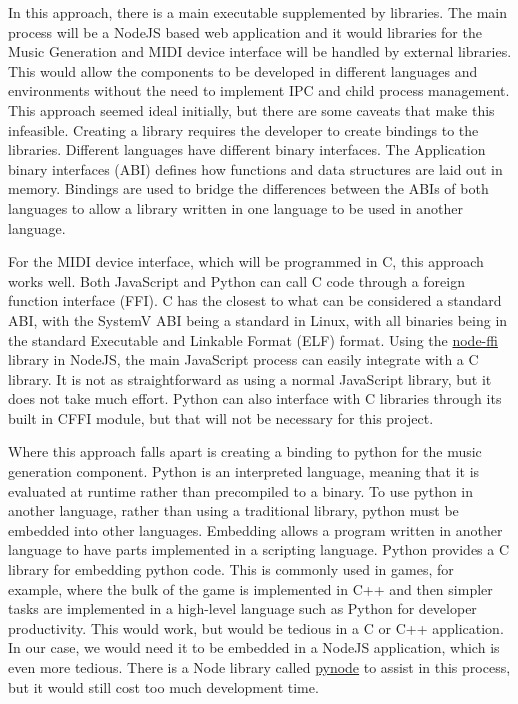 In this approach, there is a main executable supplemented by libraries. The main process
will be a NodeJS based web application and it would libraries for the Music Generation and
MIDI device interface will be handled by external libraries. This would allow the
components to be developed in different languages and environments without the need to
implement IPC and child process management. This approach seemed ideal initially, but
there are some caveats that make this infeasible. Creating a library requires the
developer to create bindings to the libraries. Different languages have different binary
interfaces. The Application binary interfaces (ABI) defines how functions and data
structures are laid out in memory. Bindings are used to bridge the differences between the
ABIs of both languages to allow a library written in one language to be used in another
language.

For the MIDI device interface, which will be programmed in C, this approach works well.
Both JavaScript and Python can call C code through a foreign function interface (FFI). C
has the closest to what can be considered a standard ABI, with the SystemV ABI being a
standard in Linux, with all binaries being in the standard Executable and Linkable Format
(ELF) format. Using the \url{node-ffi} library in NodeJS, the main JavaScript process can
easily integrate with a C library. It is not as straightforward as using a normal
JavaScript library, but it does not take much effort. Python can also interface with C
libraries through its built in CFFI module, but that will not be necessary for this
project.

Where this approach falls apart is creating a binding to python for the music generation
component. Python is an interpreted language, meaning that it is evaluated at runtime
rather than precompiled to a binary. To use python in another language, rather than using
a traditional library, python must be embedded into other languages. Embedding allows a
program written in another language to have parts implemented in a scripting language.
Python provides a C library for embedding python code. This is commonly used in games, for
example, where the bulk of the game is implemented in C++ and then simpler tasks are
implemented in a high-level language such as Python for developer productivity. This would
work, but would be tedious in a C or C++ application. In our case, we would need it to be
embedded in a NodeJS application, which is even more tedious. There is a Node library
called \url{pynode} to assist in this process, but it would still cost too much
development time.

